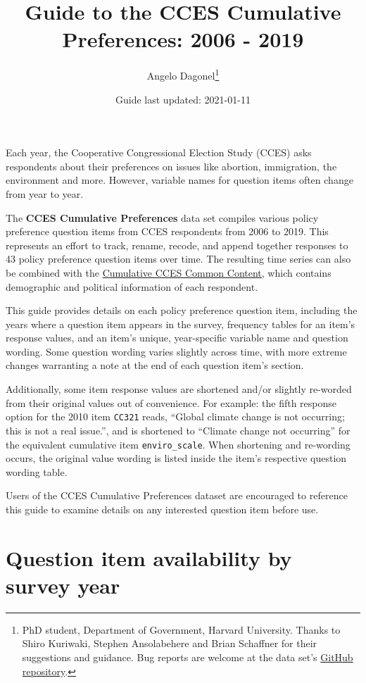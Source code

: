 \documentclass[12pt]{article}
\title{Guide to the CCES Cumulative Preferences: 2006 - 2019}
\author{Angelo Dagonel\footnote{PhD student, Department of Government, Harvard
  University. Thanks to Shiro Kuriwaki, Stephen Ansolabehere and Brian
  Schaffner for their suggestions and guidance. Bug reports are welcome
  at the data set's
  \href{https://github.com/psjello/cces_cumulative_preferences}{GitHub
  repository}.}}
\date{Guide last updated: 2021-01-11}
\begin{document}
\maketitle

Each year, the Cooperative Congressional Election Study (CCES) asks
respondents about their preferences on issues like abortion,
immigration, the environment and more. However, variable names for
question items often change from year to year.

\bigskip
The \textbf{CCES Cumulative Preferences} data set compiles various
policy preference question items from CCES respondents from 2006 to
2019. This represents an effort to track, rename, recode, and append
together responses to 43 policy preference question items over time. The
resulting time series can also be combined with the
\href{https://doi.org/10.7910/DVN/II2DB6}{Cumulative CCES Common
Content}, which contains demographic and political information of each
respondent.

\bigskip
This guide provides details on each policy preference question item,
including the years where a question item appears in the survey,
frequency tables for an item's response values, and an item's unique,
year-specific variable name and question wording. Some question wording
varies slightly across time, with more extreme changes warranting a note
at the end of each question item's section.

\bigskip
Additionally, some item response values are shortened and/or slightly
re-worded from their original values out of convenience. For example:
the fifth response option for the 2010 item \texttt{CC321} reads,
``Global climate change is not occurring; this is not a real issue.'',
and is shortened to ``Climate change not occurring'' for the equivalent
cumulative item \texttt{enviro\_scale}. When shortening and re-wording
occurs, the original value wording is listed inside the item's
respective question wording table.

\bigskip
Users of the CCES Cumulative Preferences dataset are encouraged to
reference this guide to examine details on any interested question item
before use.

\newpage

\tableofcontents

\section{Question item availability by survey
year}\label{question-item-availability-by-survey-year}
\end{document}
